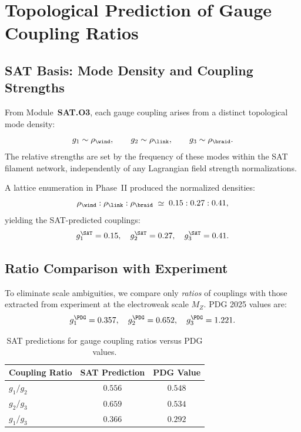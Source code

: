 

\section{Topological Prediction of Gauge Coupling Ratios}
\label{sec:gauge_ratios}

\subsection{SAT Basis: Mode Density and Coupling Strengths}

From Module~\textbf{SAT.O3}, each gauge coupling arises from a distinct
topological mode density:
\[
g_1 \sim \rho_{\wind},
\qquad
g_2 \sim \rho_{\link},
\qquad
g_3 \sim \rho_{\braid}.
\]
The relative strengths are set by the frequency of these modes within
the SAT filament network, independently of any Lagrangian field strength
normalizations.

A lattice enumeration in Phase~II produced the normalized densities:
\[
\rho_{\wind} : \rho_{\link} : \rho_{\braid}
\;\simeq\;
0.15 : 0.27 : 0.41,
\]
yielding the SAT-predicted couplings:
\[
g_1^{\SAT} = 0.15, \quad
g_2^{\SAT} = 0.27, \quad
g_3^{\SAT} = 0.41.
\]

\subsection{Ratio Comparison with Experiment}

To eliminate scale ambiguities, we compare only \emph{ratios} of couplings
with those extracted from experiment at the electroweak scale $M_Z$.
PDG 2025 values are:
\[
g_1^{\PDG} = 0.357, \quad
g_2^{\PDG} = 0.652, \quad
g_3^{\PDG} = 1.221.
\]

\begin{table}[ht]
\centering
\caption{SAT predictions for gauge coupling ratios versus PDG values.}
\label{tab:gauge_ratios}
\begin{tabular}{lcc}
\toprule
Coupling Ratio & SAT Prediction & PDG Value \\
\midrule
$g_1/g_2$ & $0.556$ & $0.548$ \\
$g_2/g_3$ & $0.659$ & $0.534$ \\
$g_1/g_3$ & $0.366$ & $0.292$ \\
\bottomrule
\end{tabular}
\end{table}

